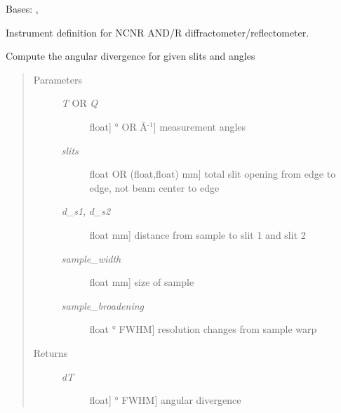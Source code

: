 \documentclass[letterpaper,10pt,english]{sphinxmanual}
\begin{document}
\begin{fulllineitems}
\label{api/ncnrdata:refl1d.ncnrdata.ANDR}
Bases: {\hyperref[api/ncnrdata:refl1d.ncnrdata.NCNRData]{}}, {\hyperref[api/instrument:refl1d.instrument.Monochromatic]{}}

Instrument definition for NCNR AND/R diffractometer/reflectometer.

\begin{fulllineitems}
\label{api/ncnrdata:refl1d.ncnrdata.ANDR.calc_dT}
Compute the angular divergence for given slits and angles
\begin{quote}\begin{description}
\item[{Parameters }] \leavevmode\begin{description}
\item[{\emph{T} OR \emph{Q}}] \leavevmode{[}{[}float{]} \textbar{} ° OR Å$^{\text{-1}}${]}
measurement angles

\item[{\emph{slits}}] \leavevmode{[}float OR (float,float) \textbar{} mm{]}
total slit opening from edge to edge, not beam center to edge

\item[{\emph{d\_s1}, \emph{d\_s2}}] \leavevmode{[}float \textbar{} mm{]}
distance from sample to slit 1 and slit 2

\item[{\emph{sample\_width}}] \leavevmode{[}float \textbar{} mm{]}
size of sample

\item[{\emph{sample\_broadening}}] \leavevmode{[}float \textbar{} ° FWHM{]}
resolution changes from sample warp

\end{description}

\item[{Returns }] \leavevmode\begin{description}
\item[{\emph{dT}}] \leavevmode{[}{[}float{]} \textbar{} ° FWHM{]}
angular divergence

\end{description}

\end{description}\end{quote}


\end{fulllineitems}
\end{fulllineitems}
\end{document}
